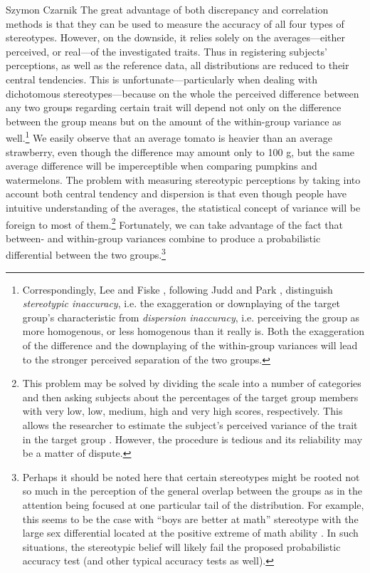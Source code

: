 \begin{artengenv}{Szymon Czarnik}
The great advantage of both discrepancy and correlation methods is that they can be used to measure the accuracy of all four types of stereotypes. However, on the downside, it relies solely on the averages—either perceived, or real—of the investigated traits. Thus in registering subjects' perceptions, as well as the reference data, all distributions are reduced to their central tendencies. This is unfortunate—particularly when dealing with dichotomous stereotypes—because on the whole the perceived difference between any two groups regarding certain trait will depend not only on the difference between the group means but on the amount of the within-group variance as well.\footnote{Correspondingly, Lee and Fiske
\parencite*[][p.138]{darity_stereotypes_2008}, %
 following Judd and Park 
\parencite*[][]{judd_definition_1993}, %
 distinguish \textit{stereotypic inaccuracy}, i.e. the exaggeration or downplaying of the target group's characteristic from \textit{dispersion inaccuracy}, i.e. perceiving the group as more homogenous, or less homogenous than it really is. Both the exaggeration of the difference and the downplaying of the within-group variances will lead to the stronger perceived separation of the two groups.} We easily observe that an average tomato is heavier than an average strawberry, even though the difference may amount only to 100 g, but the same average difference will be imperceptible when comparing pumpkins and watermelons. The problem with measuring stereotypic perceptions by taking into account both central tendency and dispersion is that even though people have intuitive understanding of the averages, the statistical concept of variance will be foreign to most of them.\footnote{This problem may be solved by dividing the scale into a number of categories and then asking subjects about the percentages of the target group members with very low, low, medium, high and very high scores, respectively. This allows the researcher to estimate the subject's perceived variance of the trait in the target group 
\parencite[e.g. see][]{swim_perceived_1994}. %
 However, the procedure is tedious and its reliability may be a matter of dispute.} Fortunately, we can take advantage of the fact that between- and within-group variances combine to produce a probabilistic differential between the two groups.\footnote{Perhaps it should be noted here that certain stereotypes might be rooted not so much in the perception of the general overlap between the groups as in the attention being focused at one particular tail of the distribution. For example, this seems to be the case with ``boys are better at math'' stereotype with the large sex differential located at the positive extreme of math ability 
\parencite[][]{benbow_psychological_1993}. %
 In such situations, the stereotypic belief will likely fail the proposed probabilistic accuracy test (and other typical accuracy tests as well). }


\end{artengenv}
